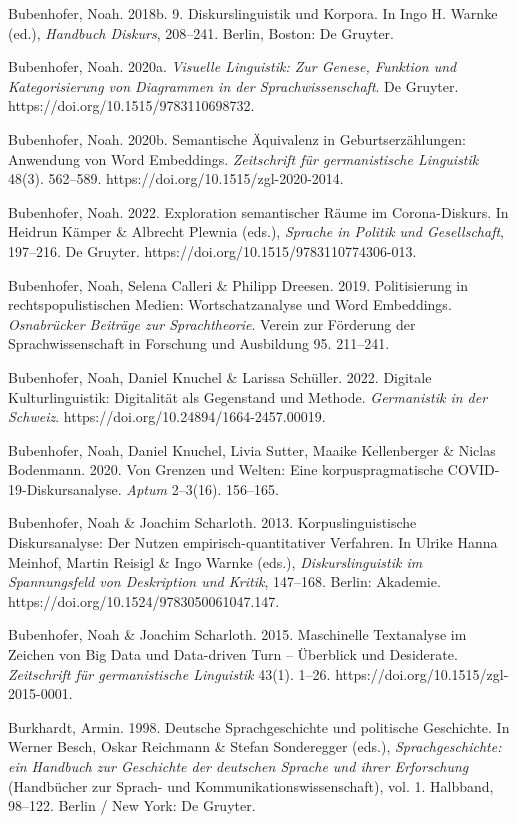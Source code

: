 Bubenhofer, Noah. 2018b. 9. Diskurslinguistik und Korpora. In Ingo H. Warnke (ed.), \emph{Handbuch Diskurs}, 208--241. Berlin, Boston: De Gruyter.

Bubenhofer, Noah. 2020a. \emph{Visuelle Linguistik: Zur Genese, Funktion und Kategorisierung von Diagrammen in der Sprachwissenschaft}. De Gruyter. https://doi.org/10.1515/9783110698732.

Bubenhofer, Noah. 2020b. Semantische Äquivalenz in Geburtserzählungen: Anwendung von Word Embeddings. \emph{Zeitschrift für germanistische Linguistik} 48(3). 562--589. https://doi.org/10.1515/zgl-2020-2014.

Bubenhofer, Noah. 2022. Exploration semantischer Räume im Corona-Diskurs. In Heidrun Kämper \& Albrecht Plewnia (eds.), \emph{Sprache in Politik und Gesellschaft}, 197--216. De Gruyter. https://doi.org/10.1515/9783110774306-013.

Bubenhofer, Noah, Selena Calleri \& Philipp Dreesen. 2019. Politisierung in rechtspopulistischen Medien: Wortschatzanalyse und Word Embeddings. \emph{Osnabrücker Beiträge zur Sprachtheorie}. Verein zur Förderung der Sprachwissenschaft in Forschung und Ausbildung 95. 211--241.

Bubenhofer, Noah, Daniel Knuchel \& Larissa Schüller. 2022. Digitale Kulturlinguistik: Digitalität als Gegenstand und Methode. \emph{Germanistik in der Schweiz}. https://doi.org/10.24894/1664-2457.00019.

Bubenhofer, Noah, Daniel Knuchel, Livia Sutter, Maaike Kellenberger \& Niclas Bodenmann. 2020. Von Grenzen und Welten: Eine korpuspragmatische COVID-19-Diskursanalyse. \emph{Aptum} 2--3(16). 156--165.

Bubenhofer, Noah \& Joachim Scharloth. 2013. Korpuslinguistische Diskursanalyse: Der Nutzen empirisch-quantitativer Verfahren. In Ulrike Hanna Meinhof, Martin Reisigl \& Ingo Warnke (eds.), \emph{Diskurslinguistik im Spannungsfeld von Deskription und Kritik}, 147--168. Berlin: Akademie. https://doi.org/10.1524/9783050061047.147.

Bubenhofer, Noah \& Joachim Scharloth. 2015. Maschinelle Textanalyse im Zeichen von Big Data und Data-driven Turn -- Überblick und Desiderate. \emph{Zeitschrift für germanistische Linguistik} 43(1). 1--26. https://doi.org/10.1515/zgl-2015-0001.

Burkhardt, Armin. 1998. Deutsche Sprachgeschichte und politische Geschichte. In Werner Besch, Oskar Reichmann \& Stefan Sonderegger (eds.), \emph{Sprachgeschichte: ein Handbuch zur Geschichte der deutschen Sprache und ihrer Erforschung} (Handbücher zur Sprach- und Kommunikationswissenschaft), vol. 1. Halbband, 98--122. Berlin / New York: De Gruyter.

